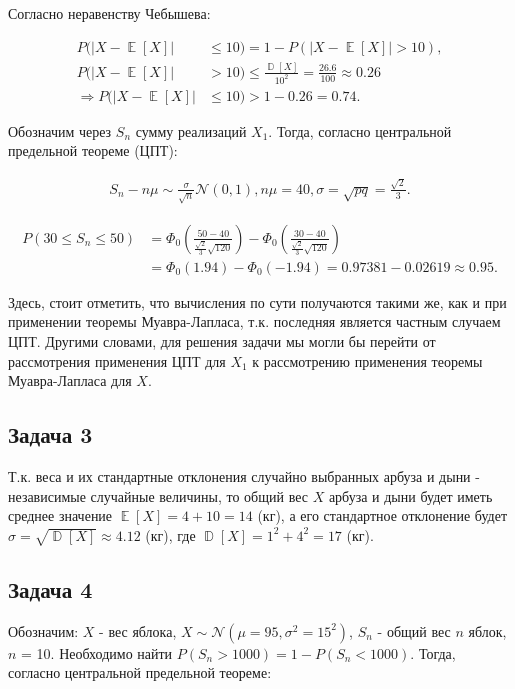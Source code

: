 \documentclass[a4paper,11pt]{article}
\DeclareMathOperator*{\D}{\mathbb{D}}   %
\DeclareMathOperator*{\E}{\mathbb{E}}   %
\begin{document}
Согласно неравенству Чебышева:

\begin{align*}
P(|X - \E[X]| & \leq 10) = 1 - P(|X - \E[X]| > 10), \\
P(|X - \E[X]| & > 10) \leq \frac{\D[X]}{10^2} = \frac{26.6}{100} \approx 0.26 \\
\Rightarrow P(|X - \E[X]| & \leq 10) > 1 - 0.26 = \boxed{0.74}.
\end{align*}

Обозначим через $S_n$ сумму реализаций $X_1$. Тогда, согласно центральной предельной теореме (ЦПТ):

\begin{align*}
S_n-n\mu \sim \frac{\sigma}{\sqrt{n}} \mathcal{N}(0, 1), n\mu = 40, \sigma = \sqrt{pq} = \frac{\sqrt{2}}{3}.
\end{align*}

\begin{align*}
P(30 \leq S_n \leq 50) & = \Phi_0(\frac{50 - 40}{\frac{\sqrt{2}}{3}\sqrt{120}}) - \Phi_0(\frac{30 - 40}{\frac{\sqrt{2}}{3}\sqrt{120}}) \\
& = \Phi_0(1.94) - \Phi_0(-1.94) = 0.97381 - 0.02619 \approx \boxed{0.95}.
\end{align*}

Здесь, стоит отметить, что вычисления по сути получаются такими же, как и при применении теоремы Муавра-Лапласа, т.к. последняя является частным случаем ЦПТ. Другими словами, для решения задачи мы могли бы перейти от рассмотрения применения ЦПТ для $X_1$ к рассмотрению применения теоремы Муавра-Лапласа для $X$.

\subsection{Задача 3}

Т.к. веса и их стандартные отклонения случайно выбранных арбуза и дыни - независимые случайные величины, то общий вес $X$ арбуза и дыни будет иметь среднее значение $\E[X] = 4 + 10 = 14$ (кг), а его стандартное отклонение будет $\sigma = \sqrt{\D[X]} \approx 4.12$ (кг), где $\D[X] = 1^2 + 4^2 = 17$ (кг).

\subsection{Задача 4}

Обозначим: $X$ - вес яблока, $X \sim \mathcal{N}(\mu = 95, \sigma^2 = 15^2)$, $S_n$ - общий вес $n$ яблок, $n$ = 10. Необходимо найти $P(S_n > 1000) = 1 - P(S_n < 1000)$. Тогда, согласно центральной предельной теореме:
\end{document}
